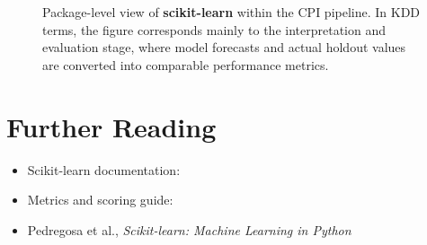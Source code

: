 \begin{figure}[htbp]
	\centering
	\resizebox{0.95\linewidth}{!}{
		}
	\caption{Package-level view of \textbf{scikit-learn} within the CPI pipeline. In KDD terms, the figure corresponds mainly to the interpretation and evaluation stage, where model forecasts and actual holdout values are converted into comparable performance metrics.}
	\label{fig:sklearn_workflow}
\end{figure}

\section{Further Reading}

\begin{itemize}
	\item Scikit-learn documentation: 
	\item Metrics and scoring guide: 
	\item Pedregosa et al., \textit{Scikit-learn: Machine Learning in Python}
\end{itemize}

